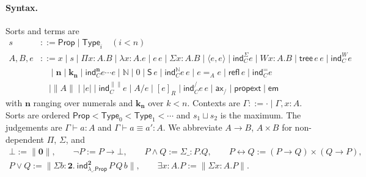 \documentclass[10pt]{article}
\newcommand{\N}{\mathbb{N}}
\newcommand{\Prop}{\mathsf{Prop}}
\newcommand{\Type}{\mathsf{Type}}
\begin{document}
\paragraph{Syntax.} Sorts and terms are
\begin{align*}
s &::= \Prop \mid \Type_i \quad(i<n)\\
A,B,e &::= x \mid s \mid \Pi x{:}A.B \mid \lambda x{:}A.e \mid e\,e
  \mid \Sigma x{:}A.B \mid \langle e,e\rangle \mid \mathsf{ind}^\Sigma_C e
  \mid W x{:}A.B \mid \mathsf{tree}\,e\,e \mid \mathsf{ind}^W_C e\\
 &\quad\mid \mathbf n \mid \mathbf k_{\mathbf n} \mid \mathsf{ind}^{\mathbf n}_C e\cdots e
  \mid \N \mid 0 \mid \mathsf S\,e \mid \mathsf{ind}^\N_C e\,e
  \mid e =_A e \mid \mathsf{refl}\,e \mid \mathsf{ind}^=_C e\\
 &\quad\mid \|A\| \mid |e| \mid \mathsf{ind}^{\|\|}_C e
  \mid A/e \mid [e]_R \mid \mathsf{ind}^{/}_C e\,e \mid \mathsf{ax}_/
  \mid \mathsf{propext} \mid \mathsf{em}
\end{align*}
with $\mathbf n$ ranging over numerals and $\mathbf k_{\mathbf n}$ over
$k<n$. Contexts are $\Gamma::=\cdot\mid\Gamma,x{:}A$. Sorts are ordered
$\Prop<\Type_0<\Type_1<\cdots$ and $s_1\sqcup s_2$ is the maximum. The
judgements are $\Gamma\vdash a:A$ and $\Gamma\vdash a\equiv a':A$. We
abbreviate $A\to B$, $A\times B$ for non-dependent $\Pi$, $\Sigma$, and
\begin{gather*}
\bot:=\|\mathbf 0\|,\qquad
\neg P:=P\to\bot,\qquad
P\wedge Q:=\Sigma\_{:}P.Q,\qquad
P\leftrightarrow Q:=(P\to Q)\times(Q\to P),\\
P\vee Q:=\|\Sigma b{:}\mathbf 2.\ \mathsf{ind}^{\mathbf 2}_{\lambda\_.\Prop}\,P\,Q\,b\|,\qquad
\exists x{:}A.P:=\|\Sigma x{:}A.P\|.
\end{gather*}
\end{document}
